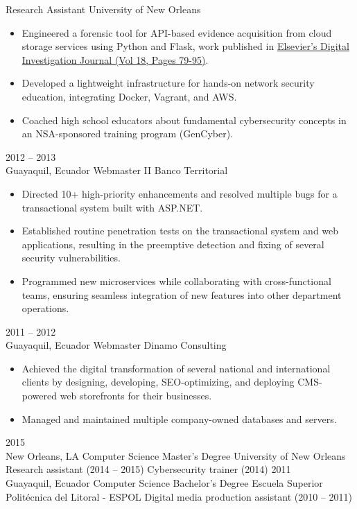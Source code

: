 \documentclass[9pt]{resume} %
\begin{document}
\begin{entrylist}
		{Research Assistant}
		{University of New Orleans}
		{
			\begin{itemize}
				\item Engineered a forensic tool for API-based evidence acquisition from cloud storage services using Python and Flask, work published in \href{https://www.sciencedirect.com/science/article/abs/pii/S1742287616300536?via=ihub}{Elsevier's Digital Investigation Journal (Vol 18, Pages 79-95)}.
				\item Developed a lightweight infrastructure for hands-on network security education, integrating Docker, Vagrant, and AWS.
				\item Coached high school educators about fundamental cybersecurity concepts in an NSA-sponsored training program (GenCyber).
			\end{itemize}
		}
	\entry
		{2012 -- 2013\\\footnotesize{Guayaquil, Ecuador}}
		{Webmaster II}
		{Banco Territorial}
		{
			\begin{itemize}
				\item Directed 10+ high-priority enhancements and resolved multiple bugs for a transactional system built with ASP.NET.
				\item Established routine penetration tests on the transactional system and web applications, resulting in the preemptive detection and fixing of several security vulnerabilities.
				\item Programmed new microservices while collaborating with cross-functional teams, ensuring seamless integration of new features into other department operations.
			\end{itemize}
		}
	\entry
		{2011 -- 2012\\\footnotesize{Guayaquil, Ecuador}}
		{Webmaster}
		{Dinamo Consulting}
		{
			\begin{itemize}
				\item Achieved the digital transformation of several national and international clients by designing, developing, SEO-optimizing, and deploying CMS-powered web storefronts for their businesses.
				\item Managed and maintained multiple company-owned databases and servers.
			\end{itemize}
		}
\end{entrylist}



\begin{entrylist}
	\entry
		{2015\\\footnotesize{New Orleans, LA}}
		{Computer Science Master's Degree}
		{University of New Orleans}
		{
			Research assistant (2014 -- 2015)\slashsep
			Cybersecurity trainer (2014)
		}
	\entry
		{2011\\\footnotesize{Guayaquil, Ecuador}}
		{Computer Science Bachelor's Degree}
		{Escuela Superior Politécnica del Litoral - ESPOL}
		{
			Digital media production assistant (2010 -- 2011)
		}
\end{entrylist}
\end{document}
